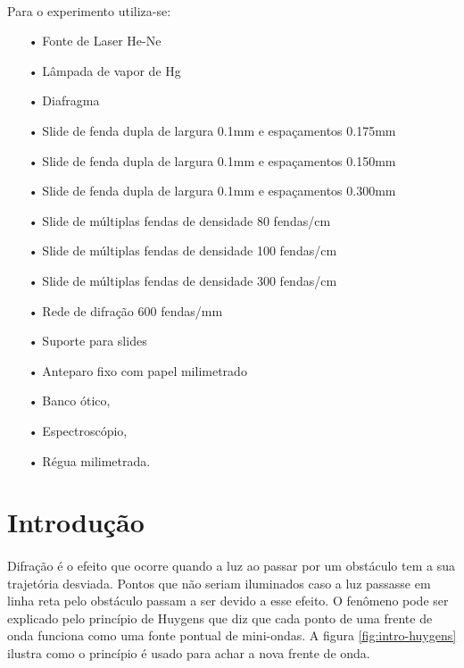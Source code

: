 \documentclass[a4paper,11pt]{article}
\begin{document}
\paragraph{} Para o experimento utiliza-se:
\begin{itemize}
	\item[•]Fonte de Laser He-Ne
	\item[•]Lâmpada de vapor de Hg
	\item[•]Diafragma
	\item[•]Slide de fenda dupla de largura 0.1mm e espaçamentos 0.175mm
	\item[•]Slide de fenda dupla de largura 0.1mm e espaçamentos 0.150mm
	\item[•]Slide de fenda dupla de largura 0.1mm e espaçamentos 0.300mm
	\item[•]Slide de múltiplas fendas de densidade 80 fendas/cm
  \item[•]Slide de múltiplas fendas de densidade 100 fendas/cm
  \item[•]Slide de múltiplas fendas de densidade 300 fendas/cm	
	\item[•]Rede de difração 600 fendas/mm
	\item[•]Suporte para slides
	\item[•]Anteparo fixo com papel milimetrado
	\item[•]Banco ótico,
	\item[•]Espectroscópio,
	\item[•]Régua milimetrada.
\end{itemize}  
\newpage
\section{Introdução}
\paragraph{}Difração é o efeito que ocorre quando a luz ao passar por
um obstáculo tem a sua trajetória desviada. Pontos que não seriam
iluminados caso a luz passasse em linha reta pelo obstáculo passam
a ser devido a esse efeito. O fenômeno pode ser explicado pelo princípio
de Huygens que diz que cada ponto de uma frente de onda funciona como uma
fonte pontual de mini-ondas. A figura \ref{fig:intro-huygens} ilustra como 
o princípio é usado para achar a nova frente de onda. 
\end{document}
